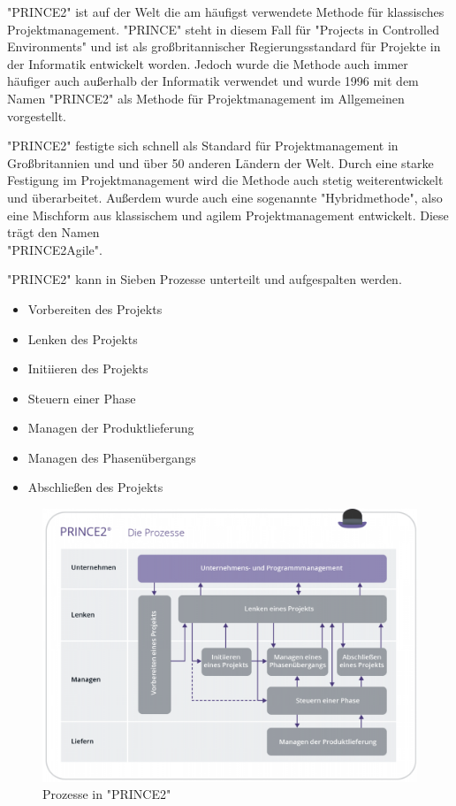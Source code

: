 
"PRINCE2" ist auf der Welt die am häufigst verwendete Methode für klassisches Projektmanagement. "PRINCE" steht in diesem Fall für "Projects in Controlled Environments" und ist als großbritannischer Regierungsstandard für Projekte in der Informatik entwickelt worden. Jedoch wurde die Methode auch immer häufiger auch außerhalb der Informatik verwendet und wurde 1996 mit dem Namen "PRINCE2" als Methode für Projektmanagement im Allgemeinen vorgestellt.

"PRINCE2" festigte sich schnell als Standard für Projektmanagement in Großbritannien und und über 50 anderen Ländern der Welt. Durch eine starke Festigung im Projektmanagement wird die Methode auch stetig weiterentwickelt und überarbeitet. Außerdem wurde auch eine sogenannte "Hybridmethode", also eine Mischform aus klassischem und agilem Projektmanagement entwickelt. Diese trägt den Namen\\ "PRINCE2Agile". \cite{Projectman.}


"PRINCE2" kann in Sieben Prozesse unterteilt und aufgespalten werden.

\begin{itemize}
    \item Vorbereiten des Projekts
    \item Lenken des Projekts
    \item Initiieren des Projekts
    \item Steuern einer Phase
    \item Managen der Produktlieferung
    \item Managen des Phasenübergangs
    \item Abschließen des Projekts
\end{itemize}

\begin{figure}[H]
    \centering
    \includegraphics[width=\textwidth]{media/ProjectManagement/Prince2.png}
    \caption{Prozesse in "PRINCE2" \cite{Prince2}}
\end{figure}

